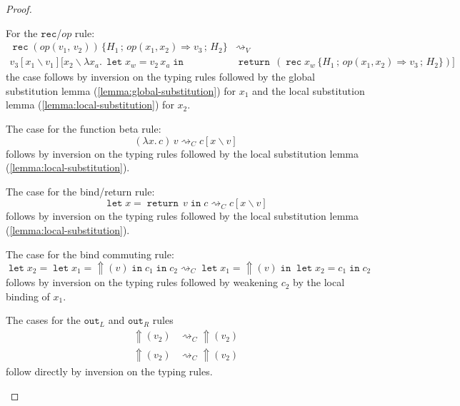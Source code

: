 \documentclass[acmsmall, screen, review, anonymous]{acmart}
\theoremstyle{definition}
\newcommand{\reflectname}{\mathord{\Uparrow}}
\newcommand{\performraw}[2]{\mathop{\reflectname(#1(#2))}}
\newcommand{\perform}[3]{\performraw{#1}{#2}(#3)}
\newcommand{\loc}{\ell}
\newcommand{\outlname}{\mathtt{out}_L}
\newcommand{\outl}[1]{\mathop{\outlname} #1}
\newcommand{\outrname}{\mathtt{out}_R}
\newcommand{\outr}[1]{\mathop{\outrname} #1}
\newcommand{\indintro}[3]{{#1}(#2,\, #3)}
\newcommand{\indelimname}{\mathtt{rec}}
\newcommand{\indelim}[2]{\mathop{\indelimname} #1 \,\{#2\}}
\newcommand{\indcase}[4]{#1(#2, #3) \Rightarrow #4}
\newcommand{\seq}{\,;\,}
\newcommand{\abs}[2]{\lambda#1.\,#2}
\newcommand{\app}[2]{#1\,#2}
\newcommand{\returnname}{\mathop{\mathtt{return}}}
\newcommand{\return}[1]{\returnname\, #1}
\newcommand{\letvname}{\mathop{\mathtt{let}}}
\newcommand{\letv}[3]{\letvname #1 = #2 \mathop{\mathtt{in}} #3}
\newcommand{\sub}[2]{[#1\backslash#2]}
\newcommand{\sbst}[3]{#1\sub{#2}{#3}}
\newcommand{\stepstoname}{\rightsquigarrow}
\newcommand{\stepstov}{\stepstoname_V}
\newcommand{\stepstoc}{\stepstoname_C}
\begin{document}
\begin{proof}
\begin{description}
For the $\indelimname$/$op$ rule:
\begin{align*}
\indelim{(\indintro{op}{v_1}{v_2})}{H_1 \seq \indcase{op}{x_1}{x_2}{v_3} \seq H_2} &\stepstov \\
  \sbst{\sbst{v_3}{x_1}{v_1}}{x_2}
  {\abs{x_a}{\letv{x_w}{\app{v_2}{x_a}}{&\return{(\indelim{x_w}{H_1 \seq \indcase{op}{x_1}{x_2}{v_3} \seq H_2})}}}}
\end{align*}
the case follows by inversion on the typing rules followed by the global
substitution lemma (\ref{lemma:global-substitution}) for $x_1$ and the
local substitution lemma (\ref{lemma:local-substitution}) for $x_2$.

\item[Functions]
The case for the function beta rule:
\begin{equation*}
\app{(\abs{x}{c})}{v} \stepstoc \sbst{c}{x}{v}
\end{equation*}
follows by inversion on the typing rules followed by the local
substitution lemma (\ref{lemma:local-substitution}).

\item[Bind]
The case for the bind/return rule:
\begin{equation*}
\letv{x}{\return{v}}{c} \stepstoc \sbst{c}{x}{v}
\end{equation*}
follows by inversion on the typing rules followed by the local
substitution lemma (\ref{lemma:local-substitution}).

The case for the bind commuting rule: 
\begin{equation*}
\letv{x_2}{\letv{x_1}{\perform{\loc}{op}{v}}{c_1}}{c_2} \stepstoc \letv{x_1}{\perform{\loc}{op}{v}}{\letv{x_2}{c_1}{c_2}}
\end{equation*}
follows by inversion on the typing rules followed by weakening $c_2$ by
the local binding of $x_1$.

\item[Reflection]

The cases for the $\outlname$ and $\outrname$ rules
\begin{align*}
\perform{(\outl{v_1})}{op}{v_2} &\stepstoc \perform{v_1}{\mathrm{left}(op)}{v_2} \\
\perform{(\outr{v_1})}{op}{v_2} &\stepstoc \perform{v_1}{\mathrm{right}(op)}{v_2}
\end{align*}
follow directly by inversion on the typing rules.

\item[Reification]


\end{description}
\end{proof}
\end{document}
